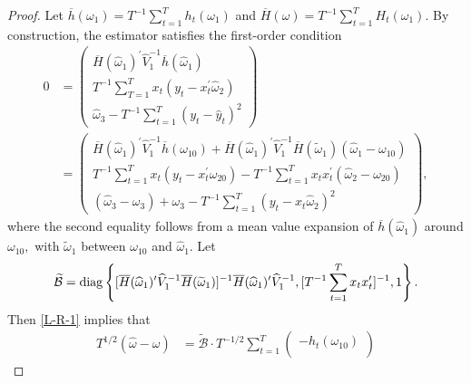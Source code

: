 \documentclass[11pt, letterpaper, twoside]{article}
\begin{document}
\begin{appendices}
\begin{proof}
Let $\overline{h}(\omega _{1})=T^{-1}\sum_{t=1}^{T}h_{t}(\omega _{1})$ and $ \overline{H}(\omega )=T^{-1}\sum_{t=1}^{T}H_{t}(\omega _{1}).$ By construction, the estimator satisfies the first-order condition
%
\begin{align}
    0 &= 
    \begin{pmatrix} 
        \overline{H}(\widehat{\omega }_{1})^{\prime }\widehat{V}_{1}^{-1}\overline{h} (\widehat{\omega }_{1}) \\ 
%
        T^{-1}\sum_{T=1}^{T}x_{t}(y_{t}-x_{t}^{\prime }\widehat{\omega }_{2}) \\ 
%
        \widehat{\omega }_{3}-T^{-1}\sum_{t=1}^{T}\left( y_{t}-\widehat{y} _{t}\right) ^{2} 
    \end{pmatrix} \nonumber \\ 
%
    &= 
%
    \begin{pmatrix}
%
        \overline{H}(\widehat{\omega }_{1})^{\prime }\widehat{V}_{1}^{-1}\overline{h} (\omega _{10})+\overline{H}(\widehat{\omega }_{1})^{\prime }\widehat{V} _{1}^{-1}\overline{H}(\widetilde{\omega }_{1})(\widehat{\omega }_{1}-\omega
_{10}) \\ 
%
        T^{-1}\sum_{t=1}^{T}x_{t}(y_{t}-x_{t}^{\prime }\omega _{20})-T^{-1}\sum_{t=1}^{T}x_{t}x_{t}^{\prime }\left( \widehat{\omega } _{2}-\omega _{20}\right) \\ 
%
        \left( \widehat{\omega }_{3}-\omega _{3}\right) +\omega _{3}-T^{-1}\sum_{t=1}^{T}\left( y_{t}-x_{t}\widehat{\omega }_{2}\right) ^{2}
    \end{pmatrix},
%
  \label{L-R-1}
\end{align}
%
where the second equality follows from a mean value expansion of $\overline{h }(\widehat{\omega }_{1})$ around $\omega _{10},$ with $\widetilde{\omega } _{1}$ between $\omega _{10}$ and $\widehat{\omega }_{1}$. 
Let
%
\begin{equation}
%
    \widetilde{\mathcal{B}} = \diag\left\lbrace[\overline{H}(\widehat{\omega }_{1})^{\prime } \widehat{V}_{1}^{-1}\overline{H}(\widetilde{\omega }_{1})]^{-1}\overline{H}( \widehat{\omega }_{1})^{\prime }\widehat{V}_{1}^{-1},[T^{-1} \sum_{t=1}^{T}x_{t}x_{t}^{\prime }]^{-1},1\right\rbrace.  
%
\end{equation}
%
Then \cref{L-R-1} implies that 
%
\begin{align}
    T^{1/2}\left( \widehat{\omega }-\omega \right) 
%    
    &= \widetilde{\mathcal{B}} \cdot T^{-1/2}\sum_{t=1}^{T} 
%
    \begin{pmatrix}
        -h_{t}(\omega _{10}) \\ 

\end{pmatrix}
\end{align}
\end{proof}
\end{appendices}
\end{document}
